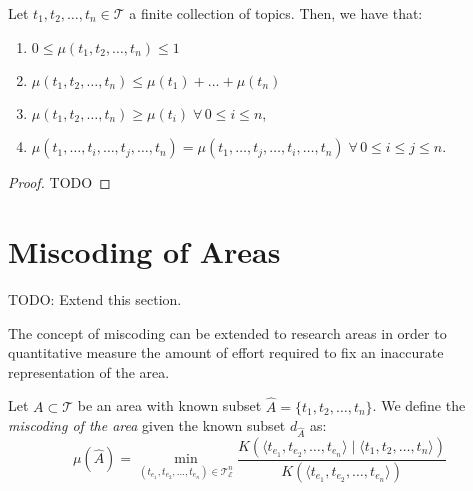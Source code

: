 \begin{proposition}
Let $t_1, t_2, \ldots, t_n \in \mathcal{T}$ a finite collection of topics. Then, we have that:

\renewcommand{\theenumi}{\roman{enumi}}
\begin{enumerate}
\item $0 \leq \mu(t_1, t_2, \ldots, t_n) \leq 1$
\item $\mu(t_1, t_2, \ldots, t_n) \leq \mu(t_1) + \ldots + \mu(t_n)$
\item $\mu(t_1, t_2, \ldots, t_n) \geq \mu(t_i) \; \forall \, 0 \leq i \leq n$,
\item $\mu(t_1, \ldots, t_i, \ldots, t_j, \ldots, t_n) = \mu(t_1, \ldots, t_j, \ldots, t_i, \ldots, t_n) \; \forall \, 0 \leq i \leq j \leq n$.
\end{enumerate}
\end{proposition}
\begin{proof}
{\color{red} TODO}
\end{proof}

%
%
\section{Miscoding of Areas}

{\color{red} TODO: Extend this section.}

The concept of miscoding can be extended to research areas in order to quantitative measure the amount of effort required to fix an inaccurate representation of the area.

\begin{definition}
Let $A \subset \mathcal{T}$ be an area with known subset $\hat{A} = \{t_1, t_2, \ldots, t_n\}$. We define the \emph{miscoding of the area} given the known subset $d_{\hat{A}}$ as:
\[
\mu(\hat{A}) = \min_{(t_{e_1}, t_{e_2}, \ldots, t_{e_n}) \in \mathcal{T}_\mathcal{E}^n}  \frac{K \left( \langle t_{e_1}, t_{e_2}, \ldots, t_{e_n} \rangle \mid \langle t_1, t_2, \ldots, t_n \rangle \right) }{K \left( \langle t_{e_1}, t_{e_2}, \ldots, t_{e_n} \rangle \right)}
\]
\end{definition}

